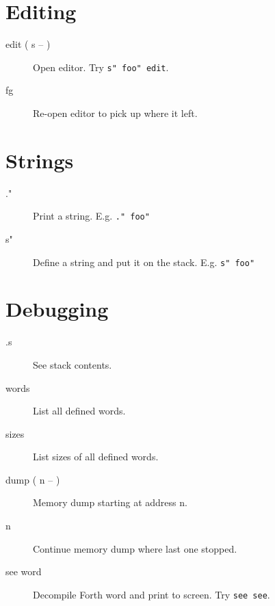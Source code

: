 \section{Editing}

\begin{description}
\item[edit ( s -- )]

Open editor. Try \texttt{s" foo" edit}.

\item[fg]

Re-open editor to pick up where it left.

\end{description}

\section{Strings}

\begin{description}
\item[."]

Print a string. E.g. \texttt{." foo"}

\item[s"]

Define a string and put it on the stack. E.g. \texttt{s" foo"}

\end{description}

\section{Debugging}

\begin{description}
\item[.s]

See stack contents.

\item[words]

List all defined words.

\item[sizes]

List sizes of all defined words.

\item[dump ( n -- )]

Memory dump starting at address n.

\item[n]

Continue memory dump where last one stopped.

\item[see word]

Decompile Forth word and print to screen. Try \texttt{see see}.

\end{description}



